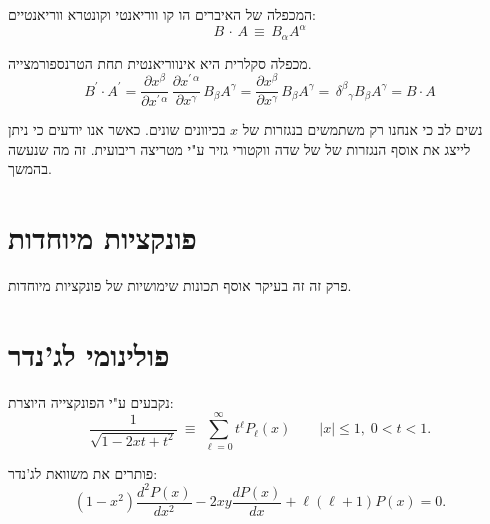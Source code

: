 \documentclass{tstextbook}
\begin{document}
\begin{definition}
המכפלה של האיברים הו קו ווריאנטי וקונטרא ווריאנטיים:
$$B\,\cdot\,A\,\equiv\,B_{\alpha}A^{\alpha}$$

\end{definition}
\begin{proposition}
מכפלה סקלרית היא אינווריאנטית תחת הטרנספורמצייה.
$$B^{\prime}\cdot A^{\prime}=\frac{\partial x^{\beta}}{\partial x^{\prime\,\alpha}}\,\frac{\partial x^{\prime\,\alpha}}{\partial x^{\gamma}}\,B_{\beta}A^{\gamma}=\frac{\partial x^{\beta}}{\partial x^{\gamma}}\,B_{\beta}A^{\gamma}=\,\delta^{\beta}{}_{\gamma}B_{\beta}A^{\gamma}=B\cdot A$$

\end{proposition}
\begin{remark}
נשים לב כי אנחנו רק משתמשים בנגזרות של \(x\) בכיוונים שונים. כאשר אנו יודעים כי ניתן לייצג את אוסף הנגזרות של של שדה ווקטורי גזיר ע"י מטריצה ריבועית. זה מה שנעשה בהמשך.

\end{remark}
\section{פונקציות מיוחדות}

פרק זה זה בעיקר אוסף תכונות שימושיות של פונקציות מיוחדות.

\section{פולינומי לג'נדר}

נקבעים ע"י הפונקצייה היוצרת:
$$\frac{1}{\sqrt{1-2x t+t^{2}}}\ \equiv\ \sum_{\ell=0}^{\infty}t^{\ell}P_{\ell}(x)\qquad|x|\leq1,\;0<t<1.$$

פותרים את משוואת לג'נדר:
$$(1-x^{2})\frac{d^{2}P(x)}{d x^{2}}-2x y\frac{d P(x)}{d x}+\ell(\ell+1)P(x)=0.$$
\end{document}
